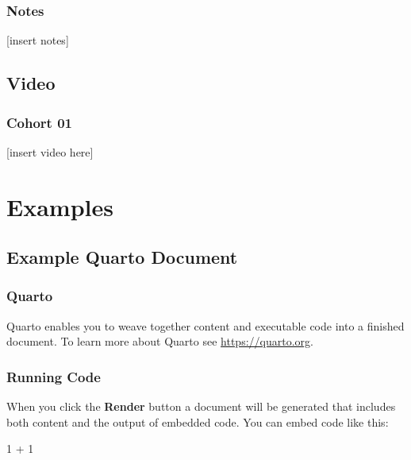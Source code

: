 \documentclass[
  letterpaper,
  DIV=11,
  numbers=noendperiod]{scrreprt}
\newenvironment{Shaded}{\begin{snugshade}}{\end{snugshade}}
\newcommand{\DecValTok}[1]{\textcolor[rgb]{0.68,0.00,0.00}{#1}}
\newcommand{\OperatorTok}[1]{\textcolor[rgb]{0.37,0.37,0.37}{#1}}
\newcommand{\OperatorTok}[1]{\textcolor[rgb]{0.37,0.37,0.37}{#1}}
\begin{document}
\begin{Shaded}
\begin{Highlighting}[]
\hypertarget{notes-1}{%
\section*{Notes}\label{notes-1}}

{[}insert notes{]}

\hypertarget{video-1}{%
\chapter*{Video}\label{video-1}}

\hypertarget{cohort-01-1}{%
\section*{Cohort 01}\label{cohort-01-1}}

{[}insert video here{]}

\part{Examples}

\hypertarget{example-quarto-document}{%
\chapter{Example Quarto Document}\label{example-quarto-document}}

\hypertarget{quarto}{%
\section{Quarto}\label{quarto}}

Quarto enables you to weave together content and executable code into a
finished document. To learn more about Quarto see
\url{https://quarto.org}.

\hypertarget{running-code}{%
\section{Running Code}\label{running-code}}

When you click the \textbf{Render} button a document will be generated
that includes both content and the output of embedded code. You can
embed code like this:

\begin{Shaded}
\begin{Highlighting}[]
\DecValTok{1} \OperatorTok{+} \DecValTok{1}
\end{Highlighting}
\end{Shaded}


\end{Highlighting}
\end{Shaded}
\end{document}
